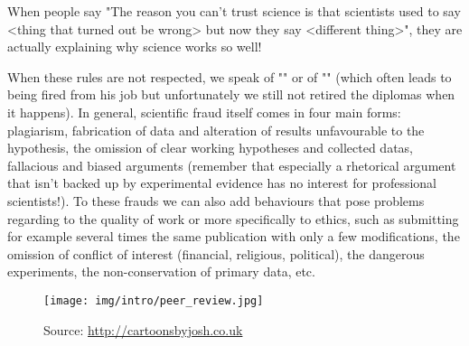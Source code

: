 	\begin{fquote}When people say "The reason you can't trust science is that scientists used to say <thing that turned out be wrong> but now they say <different thing>", they are actually explaining why science works so well!
 	\end{fquote}

	When these rules are not respected, we speak of "" or of "" (which often leads to being fired from his job but unfortunately we still not retired the diplomas when it happens). In general, scientific fraud itself comes in four main forms: plagiarism, fabrication of data and alteration of results unfavourable to the hypothesis, the omission of clear working hypotheses and collected datas, fallacious and biased arguments (remember that especially a rhetorical argument that isn't backed up by experimental evidence has no interest for professional scientists!). To these frauds we can also add behaviours that pose problems regarding to the quality of work or more specifically to ethics, such as  submitting for example several times the same publication with only a few modifications, the omission of conflict of interest (financial, religious, political), the dangerous experiments, the non-conservation of primary data, etc.
	\begin{figure}[H]
		\centering
		\texttt{[image: img/intro/peer\_review.jpg]}
		\caption[]{Source: \url{http://cartoonsbyjosh.co.uk}}
	\end{figure}	

